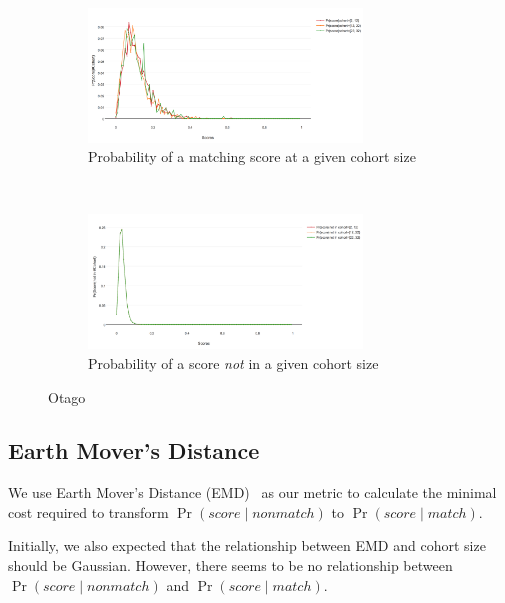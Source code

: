 \begin{figure}[htbp]
    \centering
    \begin{subfigure}[t]{\textwidth}
        \centering
        \includegraphics[width=0.8\textwidth]{dataset/otago/pscohort}
        \caption{Probability of a matching score at a given cohort size}
        \label{fig:otago_pscohort} %
    \end{subfigure}%
    \\
    \begin{subfigure}[t]{\textwidth}
        \centering
        \includegraphics[width=0.8\textwidth]{dataset/otago/psnoncohort}
        \caption{Probability of a score \emph{not} in a given cohort size}
        \label{fig:otago_psnoncohort} %
    \end{subfigure}%
    \caption{Otago}
    \label{fig:otago_psc} %
\end{figure}

\FloatBarrier%
\subsection{Earth Mover's Distance}

We use Earth Mover's Distance (EMD)~\cite{emd00} as our metric to calculate the
minimal cost required to transform $\Pr{(score \mid nonmatch)}$ to $\Pr{(score
\mid match)}$.

Initially, we also expected that the relationship between EMD and cohort size
should be Gaussian. However, there seems to be no relationship between
$\Pr{(score \mid nonmatch)}$ and $\Pr{(score \mid match)}$.

